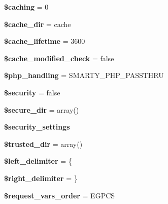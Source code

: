 \begin{DoxyCompactItemize}
\mbox{\label{class_smarty_aa36073c4cda5c97981a5b99ca92208be}} 
{\bfseries \$caching} = 0
\item 
\mbox{\label{class_smarty_a22a35efc9ca709527d49ff8bfe76db78}} 
{\bfseries \$cache\+\_\+dir} = \textquotesingle{}cache\textquotesingle{}
\item 
\mbox{\label{class_smarty_a5aaab753f75170fa670cbb602aa97119}} 
{\bfseries \$cache\+\_\+lifetime} = 3600
\item 
\mbox{\label{class_smarty_a0734d0f7c5eea130baa18c0424ab07b0}} 
{\bfseries \$cache\+\_\+modified\+\_\+check} = false
\item 
\mbox{\label{class_smarty_abb37c3c6b2bcb9a527c4139bffb7e6ca}} 
{\bfseries \$php\+\_\+handling} = S\+M\+A\+R\+T\+Y\+\_\+\+P\+H\+P\+\_\+\+P\+A\+S\+S\+T\+H\+RU
\item 
\mbox{\label{class_smarty_a7ef3408af92597c92305e22f79e67d61}} 
{\bfseries \$security} = false
\item 
\mbox{\label{class_smarty_a7694029b12fccde3ffae27a1d1d7b5be}} 
{\bfseries \$secure\+\_\+dir} = array()
\item 
{\bfseries \$security\+\_\+settings}
\item 
\mbox{\label{class_smarty_a4541edfa0e2dd6b0e4b1da10c14fa52c}} 
{\bfseries \$trusted\+\_\+dir} = array()
\item 
\mbox{\label{class_smarty_a77e272b1cacbab4b26b4fe515e445178}} 
{\bfseries \$left\+\_\+delimiter} = \textquotesingle{}\{\textquotesingle{}
\item 
\mbox{\label{class_smarty_ad3fe9ebfa998625e29836badfe1840bd}} 
{\bfseries \$right\+\_\+delimiter} = \textquotesingle{}\}\textquotesingle{}
\item 
\mbox{\label{class_smarty_a03919f6e9cba8f50093023e78b0fc6aa}} 
{\bfseries \$request\+\_\+vars\+\_\+order} = \textquotesingle{}E\+G\+P\+CS\textquotesingle{}
\item 
\mbox{\label{class_smarty_a639bdb97701da08b49252c5dbe667930}} 

\end{DoxyCompactItemize}
